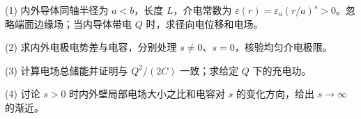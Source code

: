 (1) 内外导体同轴半径为 \(a<b\)，长度 \(L\)，介电常数为 \(\varepsilon(r)=\varepsilon_a(r/a)^s>0\)。忽略端面边缘场；当内导体带电 \(Q\) 时，求径向电位移和电场。

(2) 求内外电极电势差与电容，分别处理 \(s\ne0\)、\(s=0\)，核验均匀介电极限。

(3) 计算电场总储能并证明与 \(Q^2/(2C)\) 一致；求给定 \(Q\) 下的充电功。

(4) 讨论 \(s>0\) 时内外壁局部电场大小之比和电容对 \(s\) 的变化方向，给出 \(s\to\infty\) 的渐近。
